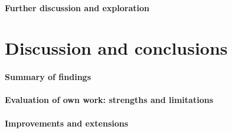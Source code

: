 \documentclass[11pt,a4paper]{article}
\begin{document}
\paragraph{Further discussion and exploration}

% 
%


\section{Discussion and conclusions}


\paragraph{Summary of findings}


\paragraph{Evaluation of own work: strengths and limitations}


\paragraph{Improvements and extensions}

\end{document}
